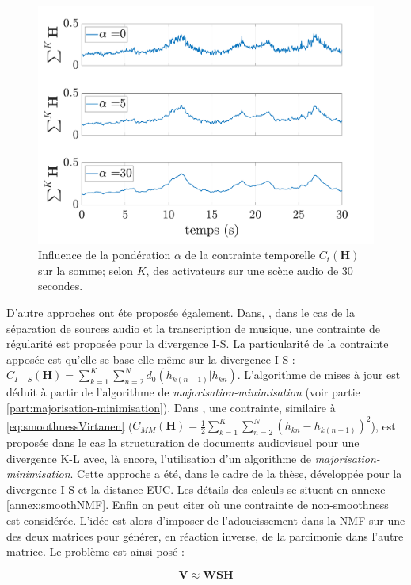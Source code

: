 \begin{figure}[hbtp]
\centering
	\includegraphics[width=0.7\linewidth]{./figures/NMF/smoothness_02.pdf}
\caption{Influence de la pondération $\alpha$ de la contrainte temporelle $C_t(\mathbf{H})$ sur la somme; selon $K$, des activateurs sur une scène audio de 30 secondes.}
\label{fig:smoothnessExample}
\end{figure}

D'autre approches ont éte proposée également. Dans, \cite{fevotte2011majorization}, dans le cas de la séparation de sources audio et la transcription de musique, une contrainte de régularité est proposée pour la divergence I-S. La particularité de la contrainte apposée est qu'elle se base elle-même sur la divergence I-S : $C_{I-S}(\mathbf{H}) = \sum_{k = 1}^{K} \sum_{n = 2}^{N}d_0(h_{k(n-1)} \vert h_{kn})$. L'algorithme de mises à jour est déduit à partir de l'algorithme de \textit{majorisation-minimisation} (voir partie \ref{part:majorisation-minimisation}). Dans \cite{essid2013smooth}, une contrainte, similaire à \ref{eq:smoothnessVirtanen} ($C_{MM}(\mathbf{H}) = \frac{1}{2}\sum_{k = 1}^{K} \sum_{n = 2}^{N}\left(h_{kn}-h_{k(n-1)}\right)^2$), est proposée dans le cas la structuration de documents audiovisuel pour une divergence K-L avec, là encore, l'utilisation d'un algorithme de \textit{majorisation-minimisation}. Cette approche a été, dans le cadre de la thèse, développée pour la divergence I-S et la distance EUC. Les détails des calculs se situent en annexe \ref{annex:smoothNMF}.
Enfin on peut citer \cite{pascual2006nonsmooth} où une contrainte de \og non-smoothness \fg{} est considérée. L'idée est alors d'imposer de l'adoucissement dans la NMF sur une des deux matrices pour générer, en réaction inverse, de la parcimonie dans l'autre matrice. Le problème est ainsi posé :

\begin{equation}
\mathbf{V} \approx \mathbf{WSH}
\end{equation}

